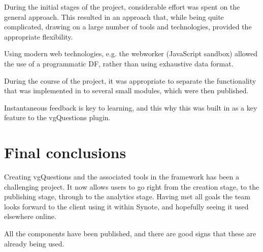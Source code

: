 
During the initial stages of the project, considerable effort was spent on the general approach. This resulted in an approach that, while being quite complicated, drawing on a large number of tools and technologies, provided the appropriate flexibility.

Using modern web technologies, e.g. the \gls{webworker} (JavaScript sandbox) allowed the use of a programmatic \gls{DF}, rather than using exhaustive data format.

During the course of the project, it was appropriate to separate the functionality that was implemented in to several small modules, which were then published.

Instantaneous feedback is key to learning, and this why this was built in as a key feature to the \gls{vgQuestions} plugin.

\section{Final conclusions}

Creating \gls{vgQuestions} and the associated tools in the framework has been a challenging project. It now allows users to go right from the creation
stage, to the publishing stage, through to the analytics stage. Having met all goals the team looks forward to the client using it within Synote, and hopefully seeing it used elsewhere online.

All the components have been published, and there are good signs that these are already being used.


